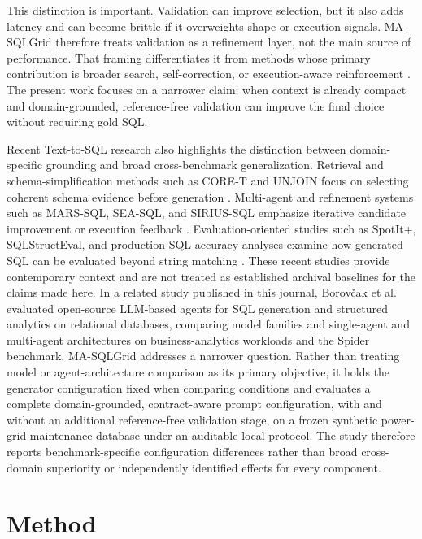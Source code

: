 \documentclass[cmc,article,submit,moreauthors,pdftex]{Definitions/tsp}
\begin{document}
This distinction is important. Validation can improve selection, but it also adds latency and can become brittle if it overweights shape or execution signals. MA-SQLGrid therefore treats validation as a refinement layer, not the main source of performance. That framing differentiates it from methods whose primary contribution is broader search, self-correction, or execution-aware reinforcement \cite{wang2023macsql,zhai2025excot,pourreza2024chasesql}. The present work focuses on a narrower claim: when context is already compact and domain-grounded, reference-free validation can improve the final choice without requiring gold SQL.

Recent Text-to-SQL research also highlights the distinction between domain-specific grounding and broad cross-benchmark generalization. Retrieval and schema-simplification methods such as CORE-T and UNJOIN focus on selecting coherent schema evidence before generation \cite{soliman2026coret,ganesan2025unjoin}. Multi-agent and refinement systems such as MARS-SQL, SEA-SQL, and SIRIUS-SQL emphasize iterative candidate improvement or execution feedback \cite{yang2025marssql,li2024seasql,luo2026siriussql}. Evaluation-oriented studies such as SpotIt+, SQLStructEval, and production SQL accuracy analyses examine how generated SQL can be evaluated beyond string matching \cite{tremante2026spotit,zhou2026sqlstructeval,arif2026agentagnostic}. These recent studies provide contemporary context and are not treated as established archival baselines for the claims made here. In a related study published in this journal, Borov\v{c}ak et al.~\cite{borovcak2026evaluating} evaluated open-source LLM-based agents for SQL generation and structured analytics on relational databases, comparing model families and single-agent and multi-agent architectures on business-analytics workloads and the Spider benchmark. MA-SQLGrid addresses a narrower question. Rather than treating model or agent-architecture comparison as its primary objective, it holds the generator configuration fixed when comparing conditions and evaluates a complete domain-grounded, contract-aware prompt configuration, with and without an additional reference-free validation stage, on a frozen synthetic power-grid maintenance database under an auditable local protocol. The study therefore reports benchmark-specific configuration differences rather than broad cross-domain superiority or independently identified effects for every component.

\section{Method}\label{method}
\end{document}
